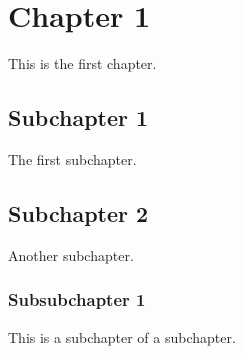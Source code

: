 \documentclass[a4paper, pdftex, 12pt]{article}
\begin{document}
\tableofcontents
\section{Chapter 1}
This is the first chapter.
\subsection{Subchapter 1}
The first subchapter.
\subsection{Subchapter 2}
Another subchapter.
\subsubsection{Subsubchapter 1}
This is a subchapter of a subchapter.
\end{document}
